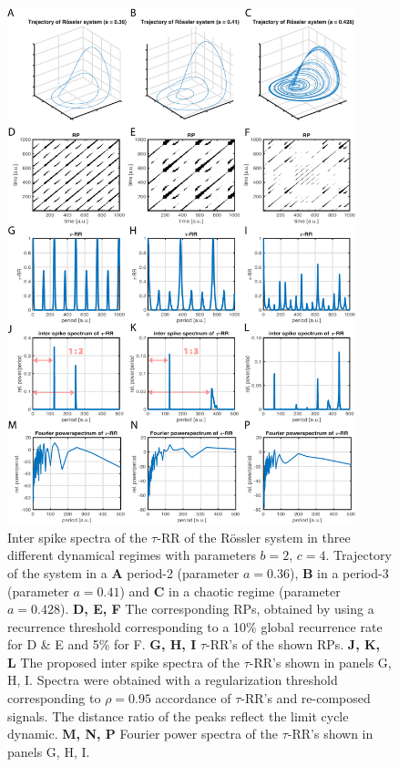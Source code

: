 \begin{figure}
 \centering
 \includegraphics[width=0.9\textwidth]{./figures/fig_tau_rr_example_roessler}
 \caption{Inter spike spectra of the $\tau$-RR of the R\"ossler system in three different dynamical regimes with parameters $b=2$, $c=4$. 
 Trajectory of the system in a \textbf{A} period-2 (parameter $a=0.36$), \textbf{B} in a period-3 (parameter $a=0.41$) and 
 \textbf{C} in a chaotic regime (parameter $a=0.428$). 
 \textbf{D, E, F} The corresponding RPs, obtained by using a recurrence threshold corresponding to a 10\% global 
 recurrence rate for D \& E and 5\% for F. 
  \textbf{G, H, I} $\tau$-RR's of the shown RPs. 
  \textbf{J, K, L} The proposed inter spike spectra of the $\tau$-RR's shown in panels G, H, I. Spectra were obtained with a regularization threshold corresponding to 
  $\rho=0.95$ accordance of $\tau$-RR's and re-composed signals. The distance ratio of the peaks reflect the limit cycle dynamic.  
  \textbf{M, N, P} Fourier power spectra of the $\tau$-RR's shown in panels G, H, I.
 }
\label{fig_tau_rr_example_roessler}
\end{figure}

